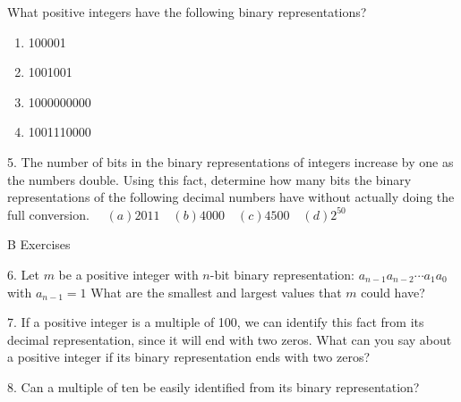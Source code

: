 \documentclass[10pt,]{book}
\theoremstyle{plain}
\theoremstyle{definition}
\begin{document}
\begin{exercisegroup}
What positive integers have the following binary representations?
\leavevmode%
\begin{enumerate}[label=(\alph*)]
\item\hypertarget{li-161}{} 100001\item\hypertarget{li-162}{} 1001001\item\hypertarget{li-163}{}1000000000\item\hypertarget{li-164}{}1001110000 \end{enumerate}
\par\smallskip
\item[5.]\hypertarget{exercise-28}{} 
The number of bits in the binary representations of integers increase by one as the numbers double.  Using this fact, determine how many bits the binary representations of the following decimal numbers have without actually doing the full conversion. 
\( \quad (a) 2011  \quad (b)  4000   \quad (c) 4500   \quad (d) 2^{50}\)\par\smallskip
\end{exercisegroup}
\par\smallskip\noindent
\hypertarget{exercisegroup-8}{}\typeout{************************************************}
\typeout{************************************************}
B Exercises%
\begin{exercisegroup}
\item[6.]\hypertarget{exercise-29}{} 
Let \(m\) be a positive integer with \( n\)-bit binary representation: \(a_{n-1}a_{n-2}\cdots  a_1a_0\) with \(a_{n-1}=1\) What are the smallest
and largest values that \(m\) could have? 
\par\smallskip
\item[7.]\hypertarget{exercise-30}{} 
If a positive integer is a multiple of 100, we can identify this fact from its decimal representation, since it will end with two zeros. What can
you say about a positive integer if its binary representation ends with two zeros? 
\par\smallskip
\item[8.]\hypertarget{exercise-31}{} 
Can a multiple of ten be easily identified from its binary representation? 
\par\smallskip
\end{exercisegroup}
\par\smallskip\noindent
\typeout{************************************************}
\typeout{************************************************}
\end{document}
